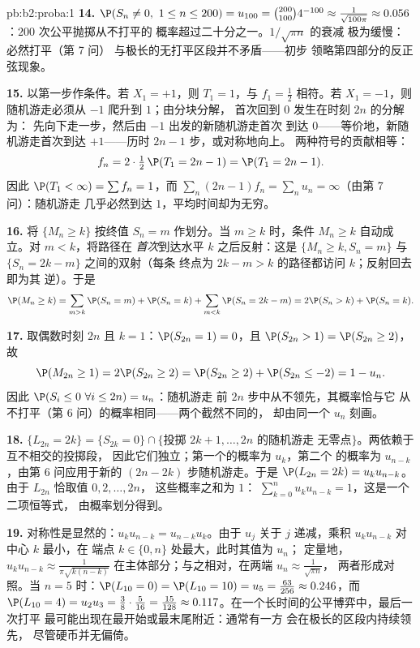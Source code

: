 \begin{solution}{pb:b2:proba:1}
\textbf{14.} $\P(S_n \neq 0,\ 1 \leq n \leq 200) = u_{100} =
\binom{200}{100}4^{-100} \approx \frac1{\sqrt{100\pi}}
\approx 0.056$：$200$ 次公平抛掷从不打平的
概率超过二十分之一。$1/\sqrt{\pi n}$ 的衰减
极为缓慢：必然打平（第 7 问）
与极长的无打平区段并不矛盾——初步
领略第四部分的反正弦现象。

\textbf{15.} 以第一步作条件。若 $X_1 = +1$，则
$T_1 = 1$，与 $f_1 = \frac12$ 相符。若 $X_1 = -1$，则
随机游走必须从 $-1$ 爬升到 $1$；由分块分解，
首次回到 $0$ 发生在时刻 $2n$ 的分解为：
先向下走一步，然后由 $-1$ 出发的新随机游走首次
到达 $0$——等价地，新随机游走首次到达
$+1$——历时 $2n - 1$ 步，或对称地向上。
两种符号的贡献相等：
\[
f_n = 2\cdot\tfrac12\,\P(T_1 = 2n - 1) = \P(T_1 = 2n-1) .
\]
因此 $\P(T_1 < \infty) = \sum f_n = 1$，而 $\sum_n(2n -
1)f_n = \sum_n u_n = \infty$（由第 7 问）：随机游走
几乎必然到达 $1$，平均时间却为无穷。

\textbf{16.} 将 $\{M_n \geq k\}$ 按终值
$S_n = m$ 作划分。当 $m \geq k$ 时，条件 $M_n \geq k$
自动成立。对 $m < k$，将路径在
\emph{首次}到达水平 $k$ 之后反射：这是
$\{M_n \geq k, S_n = m\}$ 与 $\{S_n = 2k - m\}$ 之间的双射（每条
终点为 $2k - m > k$ 的路径都访问 $k$；反射回去即为其
逆）。于是
\[
\P(M_n \geq k)
= \sum_{m > k}\P(S_n = m) + \P(S_n = k)
+ \sum_{m < k}\P(S_n = 2k - m)
= 2\P(S_n > k) + \P(S_n = k).
\]

\textbf{17.} 取偶数时刻 $2n$ 且 $k = 1$：$\P(S_{2n} = 1)
= 0$，且 $\P(S_{2n} > 1) = \P(S_{2n} \geq 2)$，故
\[
\P(M_{2n} \geq 1) = 2\P(S_{2n} \geq 2)
= \P(S_{2n} \geq 2) + \P(S_{2n} \leq -2)
= 1 - u_n .
\]
因此 $\P(S_i \leq 0\ \forall i \leq 2n) = u_n$：随机游走
前 $2n$ 步中从不领先，其概率恰与它
从不打平（第 6 问）的概率相同——两个截然不同的，
却由同一个 $u_n$ 刻画。

\textbf{18.} $\{L_{2n} = 2k\} = \{S_{2k} = 0\} \cap
\{\text{投掷 } 2k+1, \dots, 2n \text{ 的随机游走
无零点}\}$。两依赖于互不相交的投掷段，
因此它们独立；第一个的概率为 $u_k$，第二个
的概率为 $u_{n-k}$，由第 6 问应用于新的
$(2n-2k)$ 步随机游走。于是 $\P(L_{2n} = 2k) = u_ku_{n-k}$。
由于 $L_{2n}$ 恰取值 $0, 2, \dots, 2n$，
这些概率之和为 $1$：
$\sum_{k=0}^nu_ku_{n-k} = 1$，这是一个二项恒等式，
由概率划分得到。

\textbf{19.} 对称性是显然的：$u_ku_{n-k} =
u_{n-k}u_k$。由于 $u_j$ 关于 $j$ 递减，乘积
$u_ku_{n-k}$ 对中心 $k$ 最小，在
端点 $k \in \{0, n\}$ 处最大，此时其值为 $u_n$；
定量地，$u_ku_{n-k} \approx \frac1{\pi\sqrt{k(n-k)}}$
在主体部分；与之相对，在两端 $u_n \approx \frac1{\sqrt{\pi n}}$，
两者形成对照。当 $n = 5$ 时：$\P(L_{10} = 0) = \P(L_{10} = 10) =
u_5 = \frac{63}{256} \approx 0.246$，而 $\P(L_{10} = 4) =
u_2u_3 = \frac38\cdot\frac5{16} = \frac{15}{128} \approx
0.117$。在一个长时间的公平博弈中，最后一次打平
最可能出现在最开始或最末尾附近：通常有一方
会在极长的区段内持续领先，
尽管硬币并无偏倚。


\end{solution}
